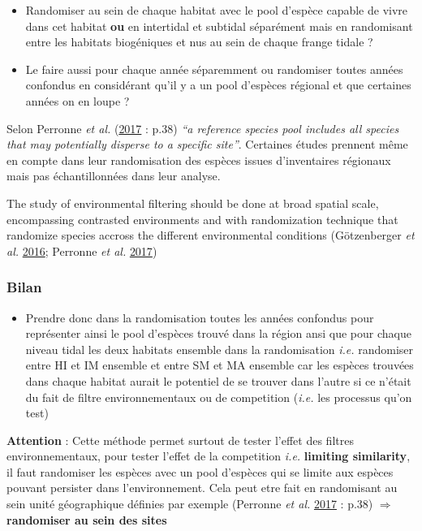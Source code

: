 \documentclass[]{article}
\providecommand{\tightlist}{%
  \setlength{\itemsep}{0pt}\setlength{\parskip}{0pt}}
\begin{document}
\begin{itemize}
\item
  Randomiser au sein de chaque habitat avec le pool d'espèce capable de
  vivre dans cet habitat \textbf{ou} en intertidal et subtidal
  séparément mais en randomisant entre les habitats biogéniques et nus
  au sein de chaque frange tidale ?
\item
  Le faire aussi pour chaque année séparemment ou randomiser toutes
  années confondus en considérant qu'il y a un pool d'espèces régional
  et que certaines années on en loupe ?
\end{itemize}

Selon Perronne \emph{et al.} (\protect\hyperlink{ref-perronne2017}{2017}
: p.38) \emph{``a reference species pool includes all species that may
potentially disperse to a specific site''}. Certaines études prennent
même en compte dans leur randomisation des espèces issues d'inventaires
régionaux mais pas échantillonnées dans leur analyse.

The study of environmental filtering should be done at broad spatial
scale, encompassing contrasted environments and with randomization
technique that randomize species accross the different environmental
conditions (Götzenberger \emph{et al.}
\protect\hyperlink{ref-gotzenberger2016randomizations}{2016}; Perronne
\emph{et al.} \protect\hyperlink{ref-perronne2017}{2017})

\subsubsection{Bilan}\label{bilan-2}

\begin{itemize}
\tightlist
\item
  Prendre donc dans la randomisation toutes les années confondus pour
  représenter ainsi le pool d'espèces trouvé dans la région ansi que
  pour chaque niveau tidal les deux habitats ensemble dans la
  randomisation \emph{i.e.} randomiser entre HI et IM ensemble et entre
  SM et MA ensemble car les espèces trouvées dans chaque habitat aurait
  le potentiel de se trouver dans l'autre si ce n'était du fait de
  filtre environnementaux ou de competition (\emph{i.e.} les processus
  qu'on test)
\end{itemize}

\textbf{Attention} : Cette méthode permet surtout de tester l'effet des
filtres environnementaux, pour tester l'effet de la competition
\emph{i.e.} \textbf{limiting similarity}, il faut randomiser les espèces
avec un pool d'espèces qui se limite aux espèces pouvant persister dans
l'environnement. Cela peut etre fait en randomisant au sein unité
géographique définies par exemple (Perronne \emph{et al.}
\protect\hyperlink{ref-perronne2017}{2017} : p.38) \(\Rightarrow\)
\textbf{randomiser au sein des sites}
\end{document}
